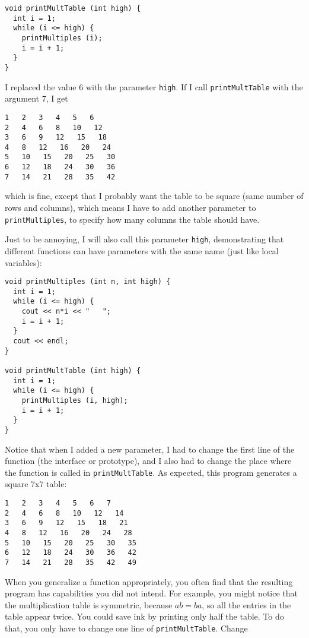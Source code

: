 \begin{verbatim}
void printMultTable (int high) {
  int i = 1;
  while (i <= high) {
    printMultiples (i);
    i = i + 1;
  }
}
\end{verbatim}
%
I replaced the value 6 with the parameter {\tt high}.  If I
call {\tt printMultTable} with the argument 7, I get

\begin{verbatim}
1   2   3   4   5   6   
2   4   6   8   10   12   
3   6   9   12   15   18   
4   8   12   16   20   24   
5   10   15   20   25   30   
6   12   18   24   30   36   
7   14   21   28   35   42   
\end{verbatim}
%
which is fine, except that I probably want the table to
be square (same number of rows and columns), which means
I have to add another parameter to {\tt printMultiples},
to specify how many columns the table should have.

Just to be annoying, I will also call this parameter {\tt high},
demonstrating that different functions can have parameters
with the same name (just like local variables):

\begin{verbatim}
void printMultiples (int n, int high) {
  int i = 1;
  while (i <= high) {
    cout << n*i << "   ";
    i = i + 1;
  }    
  cout << endl;
}

void printMultTable (int high) {
  int i = 1;
  while (i <= high) {
    printMultiples (i, high);
    i = i + 1;
  }
}
\end{verbatim}
%
Notice that when I added a new parameter, I had to change the first
line of the function (the interface or prototype), and I also had to
change the place where the function is called in {\tt printMultTable}.
As expected, this program generates a square 7x7 table:

\begin{verbatim}
1   2   3   4   5   6   7   
2   4   6   8   10   12   14   
3   6   9   12   15   18   21   
4   8   12   16   20   24   28   
5   10   15   20   25   30   35   
6   12   18   24   30   36   42   
7   14   21   28   35   42   49
\end{verbatim}
%
When you generalize a function appropriately, you often find
that the resulting program has capabilities you did not intend.
For example, you might notice that the multiplication table
is symmetric, because $ab = ba$, so all the entries in the
table appear twice.  You could save ink by printing only
half the table.  To do that, you only have to change one
line of {\tt printMultTable}.  Change

